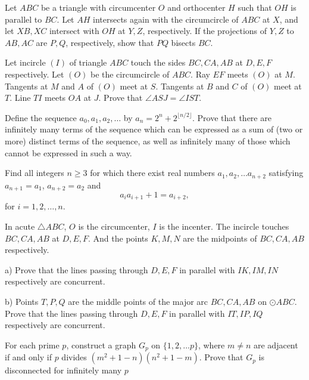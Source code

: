 \documentclass[11pt]{scrartcl}
\begin{document}
\begin{problem}[1427062131747349943]
Let $ABC$ be a triangle with circumcenter $O$ and orthocenter $H$ such that $OH$ is parallel to $BC$. Let $AH$ intersects again with the circumcircle of $ABC$ at $X$, and let $XB, XC$ intersect with $OH$ at $Y, Z$, respectively. If the projections of $Y,Z$ to $AB,AC$ are $P,Q$, respectively, show that $PQ$ bisects $BC$.
\end{problem}
\begin{problem}[8972547734710795566]
Let incircle $(I)$ of triangle $ABC$ touch the sides $BC,CA,AB$ at $D,E,F$ respectively. Let $(O)$ be the circumcircle of $ABC$. Ray $EF$ meets $(O)$ at $M$. Tangents at $M$ and $A$ of $(O)$ meet at $S$. Tangents at $B$ and $C$ of $(O)$ meet at $T$. Line $TI$ meets $OA$ at $J$. Prove that $\angle ASJ=\angle IST$.
\end{problem}
\begin{problem}[8609709793627283757]
	Define the sequence $a_0,a_1,a_2,\hdots$ by $a_n=2^n+2^{\lfloor n/2\rfloor}$. Prove that there are infinitely many terms of the sequence which can be expressed as a sum of (two or more) distinct terms of the sequence, as well as infinitely many of those which cannot be expressed in such a way.
\end{problem}
\begin{problem}[574223786384294]
Find all integers $n \geq 3$ for which there exist real numbers $a_1, a_2, \dots a_{n + 2}$ satisfying $a_{n + 1} = a_1$, $a_{n + 2} = a_2$ and
$$a_ia_{i + 1} + 1 = a_{i + 2},$$for $i = 1, 2, \dots, n$.
\end{problem}
\begin{problem}[423911944927735]
In acute $\triangle ABC$, $O$ is the circumcenter, $I$ is the incenter. The incircle touches $BC,CA,AB$ at $D,E,F$. And the points $K,M,N$ are the midpoints of $BC,CA,AB$ respectively.

a) Prove that the lines passing through $D,E,F$ in parallel with $IK,IM,IN$ respectively are concurrent.

b) Points $T,P,Q$ are the middle points of the major arc $BC,CA,AB$ on $\odot ABC$. Prove that the lines passing through $D,E,F$ in parallel with $IT,IP,IQ$ respectively are concurrent.
\end{problem}
\begin{problem}[409146991986056]
For each prime $p$, construct a graph $G_p$ on $\{1,2,\ldots p\}$, where $m\neq n$ are adjacent if and only if $p$ divides $(m^{2} + 1-n)(n^{2} + 1-m)$. Prove that $G_p$ is disconnected for infinitely many $p$
\end{problem}
\end{document}
